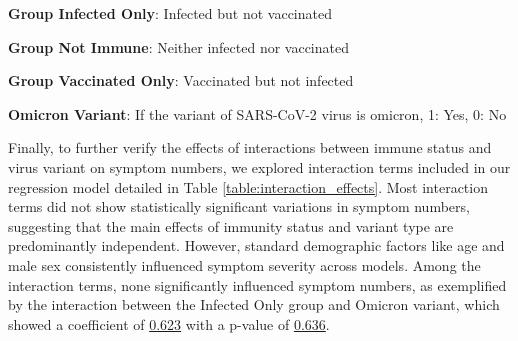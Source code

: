 \documentclass[11pt]{article}
\begin{document}
\begin{table}[h]
\begin{threeparttable}
\begin{tablenotes}
\item \textbf{Group Infected Only}: Infected but not vaccinated
\item \textbf{Group Not Immune}: Neither infected nor vaccinated
\item \textbf{Group Vaccinated Only}: Vaccinated but not infected
\item \textbf{Omicron Variant}: If the variant of SARS-CoV-2 virus is omicron, 1: Yes, 0: No
\end{tablenotes}
\end{threeparttable}
\end{table}

Finally, to further verify the effects of interactions between immune status and virus variant on symptom numbers, we explored interaction terms included in our regression model detailed in Table \ref{table:interaction_effects}. Most interaction terms did not show statistically significant variations in symptom numbers, suggesting that the main effects of immunity status and variant type are predominantly independent. However, standard demographic factors like age and male sex consistently influenced symptom severity across models. Among the interaction terms, none significantly influenced symptom numbers, as exemplified by the interaction between the Infected Only group and Omicron variant, which showed a coefficient of \hyperlink{C6a}{0.623} with a p-value of \hyperlink{C6b}{0.636}.
\end{document}
